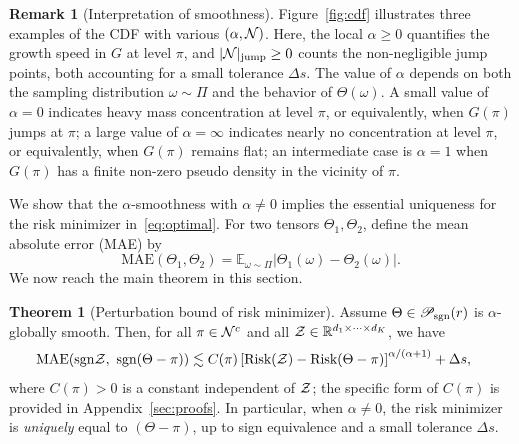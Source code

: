\documentclass[twoside,11pt]{article}
\theoremstyle{definition}
\newtheorem{thm}{Theorem}
\newtheorem{rmk}{Remark}
\def\sign{\textup{sgn}}
\def\caliP{\mathscr{P}_{\textup{sgn}}}
\begin{document}
\begin{rmk}[Interpretation of smoothness]
Figure~\ref{fig:cdf} illustrates three examples of the CDF with various $(\alpha,\mathcal{N})$. Here, the local $\alpha\geq 0$ quantifies the growth speed in $G$ at level $\pi$, and $|\mathcal{N}|_{\text{jump}}\geq 0$ counts the non-negligible jump points, both accounting for a small tolerance $\Delta s$. The value of $\alpha$ depends on both the sampling distribution $\omega\sim \Pi$ and the behavior of $\Theta(\omega)$. A small value of $\alpha=0$ indicates heavy mass concentration at level $\pi$, or equivalently, when $G(\pi)$ jumps at $\pi$; a large value of $\alpha=\infty$ indicates nearly no concentration at level $\pi$, or equivalently, when $G(\pi)$ remains flat; an intermediate case is $\alpha = 1$ when $G(\pi)$ has a finite non-zero pseudo density in the vicinity of $\pi$.


\end{rmk}

We show that the $\alpha$-smoothness with $\alpha\neq 0$ implies the essential uniqueness for the risk minimizer in~\eqref{eq:optimal}. For two tensors $\Theta_1,\Theta_2$, define the mean absolute error (MAE) by
\[
\text{MAE}(\Theta_1, \Theta_2)=\mathbb{E}_{\omega\sim \Pi}|\Theta_1(\omega)-\Theta_2(\omega)|.
\]
We now reach the main theorem in this section. 

\begin{thm}[Perturbation bound of risk minimizer]\label{thm:population} Assume $\Theta\in\caliP(r)$ is $\alpha$-globally smooth. Then, for all $\pi\in \mathcal{N}^c$ and all $\mathcal{Z}\in\mathbb{R}^{d_1\times \cdots \times d_K}$, we have
\begin{align}\label{eq:identity}
&\textup{MAE}(\sign \tZ,\ \sign (\Theta-\pi)) \lesssim  C(\pi)\left[\textup{Risk}(\tZ)-\textup{Risk}(\Theta-\pi)\right]^{\alpha/(\alpha+1)} +\Delta s,
\end{align}
where $C(\pi)>0$ is a constant independent of $\mathcal{Z}$; the specific form of $C(\pi)$ is provided in Appendix~\ref{sec:proofs}. In particular, when $\alpha\neq 0$, the risk minimizer is \emph{uniquely} equal to $(\Theta-\pi)$, up to sign equivalence and a small tolerance $\Delta s$. 
\end{thm}
\end{document}
